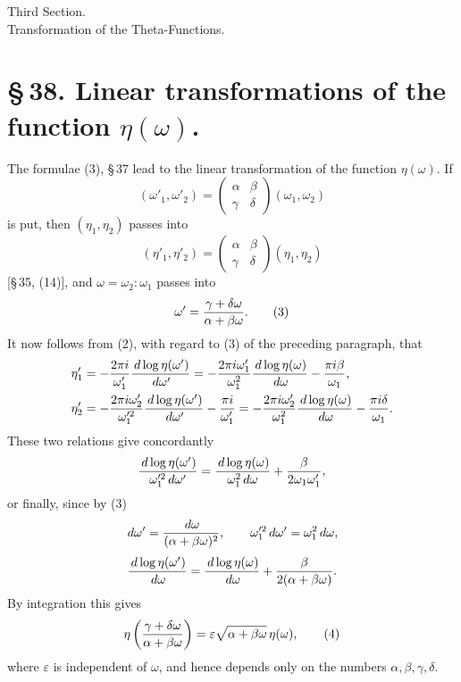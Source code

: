 \documentclass[11pt]{article}
\providecommand{\dd}{\,d}
\begin{document}
\begin{center}
{\large Third Section.}\\[0.7em]
{\Large Transformation of the Theta-Functions.}
\end{center}

\section*{\S\,38. Linear transformations of the function $\eta(\omega)$.}

The formulae (3), \S\,37 lead to the linear transformation of the function $\eta(\omega)$. If
\begin{equation}
(\omega'_1,\omega'_2)=
\begin{pmatrix}\alpha&\beta\\ \gamma&\delta\end{pmatrix}(\omega_1,\omega_2) 
\tag{1}
\end{equation}
is put, then $(\eta_1,\eta_2)$ passes into
\begin{equation}
(\eta'_1,\eta'_2)=
\begin{pmatrix}\alpha&\beta\\ \gamma&\delta\end{pmatrix}(\eta_1,\eta_2) 
\tag{2}
\end{equation}
[\S\,35, (14)], and $\omega=\omega_2:\omega_1$ passes into
\begin{equation}
\omega'={\gamma+\delta\omega\over \alpha+\beta\omega}. 
\tag{3}
\end{equation}
It now follows from (2), with regard to (3) of the preceding paragraph, that
\begin{align*}
\eta'_1&=-{2\pi i\over \omega'_1}{\dd\log\eta(\omega')\over\dd\omega'}
=-{2\pi i\omega'_1\over\omega_1^2}{\dd\log\eta(\omega)\over\dd\omega}-{\pi i\beta\over\omega_1},\\
\eta'_2&=-{2\pi i\omega'_2\over \omega_1'^2}{\dd\log\eta(\omega')\over\dd\omega'}-{\pi i\over\omega'_1}
=-{2\pi i\omega'_2\over\omega_1^2}{\dd\log\eta(\omega)\over\dd\omega}-{\pi i\delta\over\omega_1}.
\end{align*}
These two relations give concordantly
\[
 {\dd\log\eta(\omega')\over \omega_1'^2\dd\omega'}
 = {\dd\log\eta(\omega)\over\omega_1^2\dd\omega}
 +{\beta\over2\omega_1\omega_1'},
\]
or finally, since by (3)
\[
\dd\omega'={\dd\omega\over(\alpha+\beta\omega)^2},
\qquad \omega_1'^2\dd\omega'=\omega_1^2\dd\omega,
\]
\[
{\dd\log\eta(\omega')\over\dd\omega}
={\dd\log\eta(\omega)\over\dd\omega}+{\beta\over2(\alpha+\beta\omega)}.
\]
By integration this gives
\begin{equation}
\eta\left({\gamma+\delta\omega\over\alpha+\beta\omega}\right)
=\varepsilon\sqrt{\alpha+\beta\omega}\,\eta(\omega),
\tag{4}
\end{equation}
where $\varepsilon$ is independent of $\omega$, and hence depends only on the numbers $\alpha,\beta,\gamma,\delta$.
\end{document}
